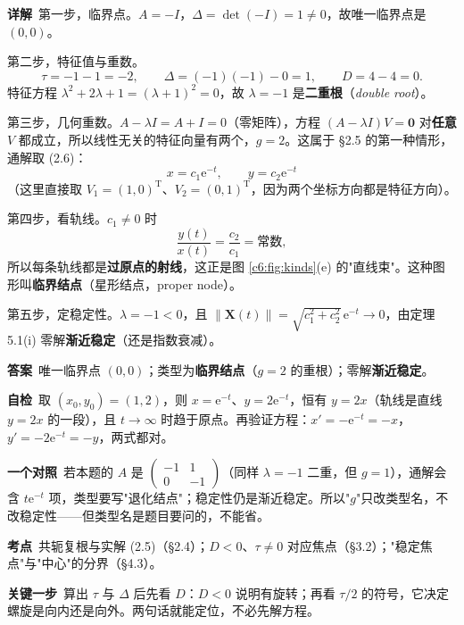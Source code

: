 \documentclass[11pt]{ctexart}
\renewcommand{\qbreak}{\needspace{0.26\textheight}}
\newcommand{\qpagebreak}{\needspace{0.92\textheight}}
\newcommand{\X}{\mathbf{X}}\newcommand{\Y}{\mathbf{Y}}
\newcommand{\norm}[1]{\left\lVert#1\right\rVert}
\newcommand{\EN}[1]{\textcolor{inkgray}{\itshape #1}}
\begin{document}
\textbf{详解}\
第一步，临界点。$A=-I$，$\Delta=\det(-I)=1\neq0$，故唯一临界点是 $(0,0)$。

第二步，特征值与重数。
\[
\tau=-1-1=-2,\qquad \Delta=(-1)(-1)-0=1,\qquad D=4-4=0 .
\]
特征方程 $\lambda^{2}+2\lambda+1=(\lambda+1)^{2}=0$，故 $\lambda=-1$ 是\textbf{二重根}（\EN{double root}）。

第三步，几何重数。$A-\lambda I=A+I=0$（零矩阵），方程 $(A-\lambda I)V=\mathbf{0}$ 对\textbf{任意} $V$ 都成立，所以线性无关的特征向量有两个，$g=2$。这属于 §2.5 的第一种情形，通解取 (2.6)：
\[
x=c_1\mathrm{e}^{-t},\qquad y=c_2\mathrm{e}^{-t}
\]
（这里直接取 $V_1=(1,0)^{\mathrm T}$、$V_2=(0,1)^{\mathrm T}$，因为两个坐标方向都是特征方向）。

第四步，看轨线。$c_1\neq0$ 时
\[
\frac{y(t)}{x(t)}=\frac{c_2}{c_1}=\text{常数},
\]
所以每条轨线都是\textbf{过原点的射线}，这正是图 \ref{c6:fig:kinds}(e) 的"直线束"。这种图形叫\textbf{临界结点}（星形结点，proper node）。

第五步，定稳定性。$\lambda=-1<0$，且 $\norm{\X(t)}=\sqrt{c_1^{2}+c_2^{2}}\,\mathrm{e}^{-t}\to0$，由定理 5.1(i) 零解\textbf{渐近稳定}（还是指数衰减）。

\textbf{答案}\ 唯一临界点 $(0,0)$；类型为\textbf{临界结点}（$g=2$ 的重根）；零解\textbf{渐近稳定}。

\textbf{自检}\ 取 $(x_0,y_0)=(1,2)$，则 $x=\mathrm{e}^{-t}$、$y=2\mathrm{e}^{-t}$，恒有 $y=2x$（轨线是直线 $y=2x$ 的一段），且 $t\to\infty$ 时趋于原点。再验证方程：$x'=-\mathrm{e}^{-t}=-x$，$y'=-2\mathrm{e}^{-t}=-y$，两式都对。

\textbf{一个对照}\ 若本题的 $A$ 是 $\begin{pmatrix}-1&1\\0&-1\end{pmatrix}$（同样 $\lambda=-1$ 二重，但 $g=1$），通解会含 $t\mathrm{e}^{-t}$ 项，类型要写"退化结点"；稳定性仍是渐近稳定。所以"$g$"只改类型名，不改稳定性——但类型名是题目要问的，不能省。

\qpagebreak
\qbreak
{}
\label{c6:app:a3}

\textbf{考点}\ 共轭复根与实解 (2.5)（§2.4）；$D<0$、$\tau\neq0$ 对应焦点（§3.2）；"稳定焦点"与"中心"的分界（§4.3）。

\textbf{关键一步}\ 算出 $\tau$ 与 $\Delta$ 后先看 $D$：$D<0$ 说明有旋转；再看 $\tau/2$ 的符号，它决定螺旋是向内还是向外。两句话就能定位，不必先解方程。
\end{document}
